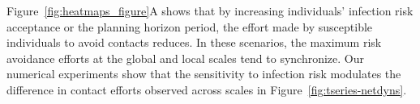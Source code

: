 \documentclass[9pt,twocolumn,twoside]{pnas-new}
\begin{document}
%
Figure~\ref{fig:heatmaps_figure}A shows that by increasing individuals' infection risk acceptance or the planning horizon period, the effort made by susceptible individuals to avoid contacts reduces. In these scenarios, the maximum risk avoidance efforts at the global and local scales tend to synchronize.
%
%
%
%
%
Our numerical experiments show that 
the sensitivity to infection risk modulates the difference in contact efforts observed across scales in Figure~\ref{fig:tseries-netdyns}.

\end{document}
